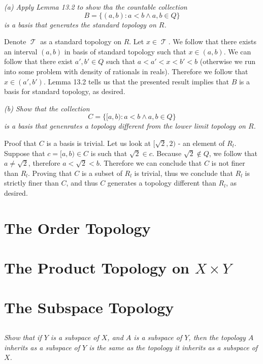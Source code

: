 \documentclass[11pt,oneside,titlepage]{book}
\DeclareMathOperator \topol {\mathcal {T}}
\newcommand{\set}[1]{\{ #1 \}}
\begin{document}
\textit{(a) Apply Lemma 13.2 to show tha the countable collection
  $$B = \set{(a, b): a < b \land a, b \in Q}$$
  is a basis that generates the standard topology on $R$.}

Denote $\topol$ as a standard topology on $R$. Let $x \in \topol$. We follow that
there exists an interval $(a, b)$ in basis of standard topology such that
$x \in (a, b)$. We can follow that there exist $a', b' \in Q$ such that
$a < a' < x < b' < b$ (otherwise we run into some problem with density of rationals
in reals). Therefore we follow that $x \in (a', b')$. Lemma 13.2 tells us that
the presented result implies that $B$ is a basis for standard topology, as desired.

\textit{(b) Show that the collection
  $$C = \set{[a, b): a < b \land a, b \in Q}$$
  is a basis that genenrates a topology different from the lower limit topology on $R$.}

Proof that $C$ is a basis is trivial.
Let us look at $[\sqrt{2}, 2)$ - an element of $R_l$. Suppose that $c = [a, b) \in C$ is
such that $\sqrt{2} \in c$. Because $\sqrt{2} \notin Q$, we follow that
$a \neq \sqrt{2}$, therefore $a < \sqrt{2} < b$. Therefore we can conclude that $C$ is
not finer than $R_l$. Proving that $C$ is a subset of $R_l$ is trivial, thus
we conclude that $R_l$ is strictly finer than $C$, and thus $C$ generates a topology
different than $R_l$, as desired.

\section{The Order Topology}

\section{The Product Topology on $X \times Y$}

\section{The Subspace Topology}

\subsection{}

\textit{Show that if $Y$ is a subspace of $X$, and $A$ is a subspace of $Y$, then the topology
  $A$ inherits as a subspace of $Y$ is the same as the topology it
  inherits as a subspace of $X$.}
\end{document}
